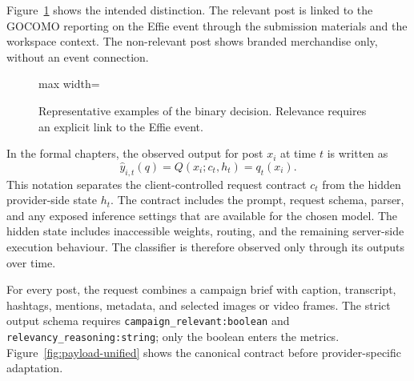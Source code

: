 Figure~\ref{fig:campaign-relevance-examples} shows the intended distinction. The relevant post is linked to the GOCOMO reporting on the Effie event through the submission materials and the workspace context. The non-relevant post shows branded merchandise only, without an event connection.

\begin{figure}[htbp]
\centering
\begin{adjustbox}{max width=\linewidth}

\end{adjustbox}
\caption[Representative campaign-relevance examples]{Representative examples of the binary decision. Relevance requires an explicit link to the Effie event.}
\label{fig:campaign-relevance-examples}
\end{figure}

In the formal chapters, the observed output for post \(x_i\) at time \(t\) is written as
\[
\hat y_{i,t}(q)=Q(x_i;c_t,h_t)=q_t(x_i).
\]
This notation separates the client-controlled request contract \(c_t\) from the hidden provider-side state \(h_t\). The contract includes the prompt, request schema, parser, and any exposed inference settings that are available for the chosen model. The hidden state includes inaccessible weights, routing, and the remaining server-side execution behaviour. The classifier is therefore observed only through its outputs over time.

For every post, the request combines a campaign brief with caption, transcript, hashtags, mentions, metadata, and selected images or video frames. The strict output schema requires \texttt{campaign\_relevant:boolean} and \texttt{relevancy\_reasoning:string}; only the boolean enters the metrics. Figure~\ref{fig:payload-unified} shows the canonical contract before provider-specific adaptation.

